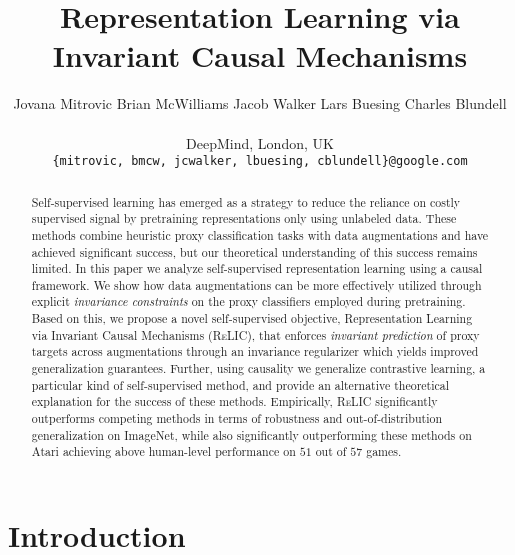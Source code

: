 \documentclass{article}
\title{Representation Learning via \\ Invariant Causal Mechanisms}
\author{Jovana Mitrovic
  \quad Brian McWilliams
  \quad Jacob Walker
  \quad Lars Buesing
  \quad Charles Blundell \\ \\
    \hspace{5cm} DeepMind, London, UK \\
    \hspace{0.6cm} \texttt{\{mitrovic, bmcw, jcwalker, lbuesing, cblundell\}@google.com} \\
}
\newcommand{\relic}{\textsc{ReLIC}}
\begin{document}
\maketitle

\begin{abstract}
Self-supervised learning has emerged as a strategy to reduce the reliance on costly supervised signal by pretraining representations only using unlabeled data.
These methods combine heuristic proxy classification tasks with data augmentations and have achieved significant success, but our theoretical understanding of this success remains limited.
In this paper we analyze self-supervised representation learning using a causal framework.
We show how data augmentations can be more effectively utilized through explicit \emph{invariance constraints} on the proxy classifiers employed during pretraining. 
Based on this, we propose a novel self-supervised objective, 
Representation Learning via Invariant Causal Mechanisms (\relic{}), that enforces \emph{invariant prediction} of proxy targets across augmentations through an invariance regularizer
which yields improved generalization guarantees.
Further, using causality we generalize contrastive learning, a particular kind of self-supervised method, and provide an alternative theoretical explanation for the success of these methods.
Empirically, \relic{} significantly outperforms competing methods in terms of robustness and out-of-distribution generalization on ImageNet, while also significantly outperforming these methods on Atari achieving above human-level performance on $51$ out of $57$ games. 
\end{abstract}

\section{Introduction}
\end{document}
